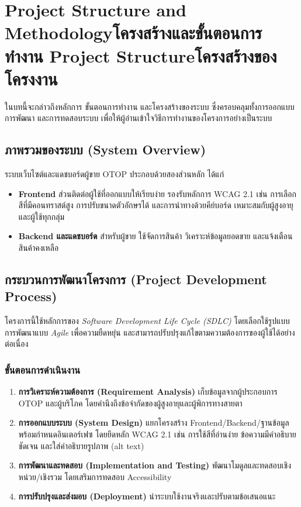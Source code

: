 \chapter{\ifproject%
\ifenglish Project Structure and Methodology\else โครงสร้างและขั้นตอนการทำงาน\fi
\else%
\ifenglish Project Structure\else โครงสร้างของโครงงาน\fi
\fi
}

ในบทนี้จะกล่าวถึงหลักการ ขั้นตอนการทำงาน และโครงสร้างของระบบ
ซึ่งครอบคลุมทั้งการออกแบบ การพัฒนา และการทดสอบระบบ \cite{pressman2014}
เพื่อให้ผู้อ่านเข้าใจวิธีการทำงานของโครงการอย่างเป็นระบบ

\section{ภาพรวมของระบบ (System Overview)}
ระบบเว็บไซต์และแดชบอร์ดผู้ขาย OTOP ประกอบด้วยสองส่วนหลัก ได้แก่ \cite{ecommerce2019}
\begin{itemize}
  \item \textbf{Frontend} ส่วนติดต่อผู้ใช้ที่ออกแบบให้เรียบง่าย 
  รองรับหลักการ WCAG 2.1 เช่น การเลือกสีที่มีคอนทราสต์สูง 
  การปรับขนาดตัวอักษรได้ และการนำทางด้วยคีย์บอร์ด 
  เหมาะสมกับผู้สูงอายุและผู้ใช้ทุกกลุ่ม
  \item \textbf{Backend และแดชบอร์ด} สำหรับผู้ขาย ใช้จัดการสินค้า วิเคราะห์ข้อมูลยอดขาย 
  และแจ้งเตือนสินค้าคงเหลือ
\end{itemize}

\section{กระบวนการพัฒนาโครงการ (Project Development Process)}
โครงการนี้ใช้หลักการของ \textit{Software Development Life Cycle (SDLC)} \cite{pressman2014}
โดยเลือกใช้รูปแบบการพัฒนาแบบ \textit{Agile} เพื่อความยืดหยุ่น \cite{pressman2014}
และสามารถปรับปรุงแก้ไขตามความต้องการของผู้ใช้ได้อย่างต่อเนื่อง

\subsection{ขั้นตอนการดำเนินงาน}
\begin{enumerate}
  \item \textbf{การวิเคราะห์ความต้องการ (Requirement Analysis)} 
  เก็บข้อมูลจากผู้ประกอบการ OTOP และผู้บริโภค \cite{otop2020}
  โดยคำนึงถึงข้อจำกัดของผู้สูงอายุและผู้พิการทางสายตา
  \item \textbf{การออกแบบระบบ (System Design)} 
  แยกโครงสร้าง Frontend/Backend/ฐานข้อมูล พร้อมกำหนดอินเตอร์เฟซ 
  โดยยึดหลัก WCAG 2.1 เช่น การใช้สีที่อ่านง่าย ข้อความมีคำอธิบายชัดเจน 
  และใส่คำอธิบายรูปภาพ (alt text) \cite{pressman2014}
  \item \textbf{การพัฒนาและทดสอบ (Implementation and Testing)} 
  พัฒนาโมดูลและทดสอบเชิงหน่วย/เชิงรวม \cite{pressman2014}
  โดยเสริมการทดสอบ Accessibility
  \item \textbf{การปรับปรุงและส่งมอบ (Deployment)} 
  นำระบบใช้งานจริงและปรับตามข้อเสนอแนะ \cite{ecommerce2019}
\end{enumerate}

